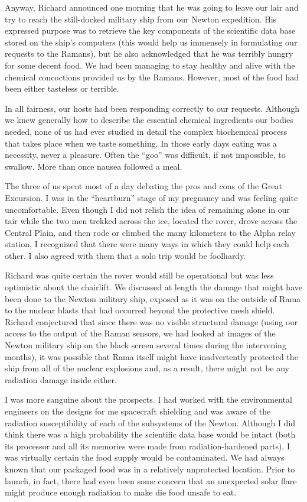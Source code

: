 \documentclass[]{article}
\begin{document}
Anyway, Richard announced one morning that he was going to leave our lair and try to reach the still-docked military ship from our Newton expedition. His expressed purpose was to retrieve the key components of the scientific data base stored on the ship’s computers (this would help us immensely in formulating our requests to the Ramans), but he also acknowledged that he was terribly hungry for some decent food. We had been managing to stay healthy and alive with the chemical concoctions provided us by the Ramans. However, most of the food had been either tasteless or terrible.

In all fairness, our hosts had been responding correctly to our requests. Although we knew generally how to describe the essential chemical ingredients our bodies needed, none of us had ever studied in detail the complex biochemical process that takes place when we taste something. In those early days eating was a necessity, never a pleasure. Often the “goo” was difficult, if not impossible, to swallow. More than once nausea followed a meal.

The three of us spent most of a day debating the pros and cons of the Great Excursion. I was in the “heartburn” stage of my pregnancy and was feeling quite uncomfortable. Even though I did not relish the idea of remaining alone in our tair while the two men trekked across the ice, located the rover, drove across the Central Plain, and then rode or climbed the many kilometers to the Alpha relay station, I recognized that there were many ways in which they could help each other. I also agreed with them that a solo trip would be foolhardy.

Richard was quite certain the rover would still be operational but was less optimistic about the chairlift. We discussed at length the damage that might have been done to the Newton military ship, exposed as it was on the outside of Rama to the nuclear blasts that had occurred beyond the protective mesh shield. Richard conjectured that since there was no visible structural damage (using our access to the output of the Raman sensors, we had looked at images of the Newton military ship on the black screen several times during the intervening months), it was possible that Rama itself might have inadvertently protected the ship from all of the nuclear explosions and, as a result, there might not be any radiation damage inside either.

I was more sanguine about the prospects. I had worked with the environmental engineers on the designs for me spacecraft shielding and was aware of the radiation susceptibility of each of the subsystems of the Newton. Although I did think there was a high probability the scientific data base would be intact (both its processor and all its memories were made from radiation-hardened parts), I was virtually certain the food supply would be contaminated. We had always known that our packaged food was in a relatively unprotected location. Prior to launch, in fact, there had even been some concern that an unexpected solar flare might produce enough radiation to make die food unsafe to eat.
\end{document}
